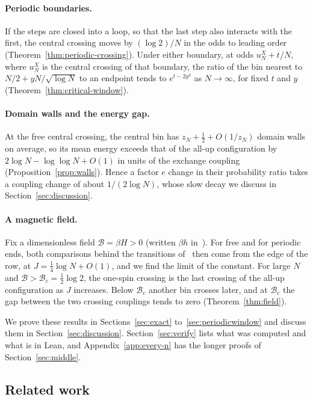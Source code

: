 \documentclass[11pt]{article}
\theoremstyle{definition}
\theoremstyle{remark}
\begin{document}
\paragraph{Periodic boundaries.} If the steps are closed into a loop, so that
the last step also interacts with the first, the central crossing moves by
$(\log2)/N$ in the odds to leading order (Theorem~\ref{thm:periodic-crossing}).
Under either boundary, at odds $u_N^X+t/N$, where $u_N^X$ is the central
crossing of that boundary, the ratio of the bin nearest to $N/2+yN/\sqrt{\log N}$ to an
endpoint tends to $e^{t-2y^2}$ as $N\to\infty$, for fixed $t$ and $y$
(Theorem~\ref{thm:critical-window}).

\paragraph{Domain walls and the energy gap.}
At the free central crossing, the central bin has
$z_N+\frac12+O(1/z_N)$ domain walls on average, so its mean energy
exceeds that of the all-up configuration by
$2\log N-\log\log N+O(1)$ in units of the exchange coupling
(Proposition~\ref{prop:walls}).
Hence a factor $e$ change in their probability ratio takes a coupling
change of about $1/(2\log N)$, whose slow decay we discuss in
Section~\ref{sec:discussion}.

\paragraph{A magnetic field.} Fix a dimensionless field
$\mathcal B=\beta H>0$ (written $\beta h$ in~\cite{stepanyan2024}). For free and for periodic ends,
both comparisons behind the transitions of~\cite{stepanyan2024} then come from the edge of
the row, at $J=\frac14\log N+O(1)$, and we find the limit of the constant. For large $N$ and $\mathcal B>\mathcal B_c=\frac12\log2$, the
one-spin crossing is the last crossing of the all-up configuration as $J$ increases. Below
$\mathcal B_c$ another bin crosses later, and at $\mathcal B_c$ the
gap between the two crossing couplings tends to zero (Theorem~\ref{thm:field}).

We prove these results in Sections~\ref{sec:exact} to~\ref{sec:periodicwindow}
and discuss them in Section~\ref{sec:discussion}.
Section~\ref{sec:verify} lists what was computed and what is in
Lean, and Appendix~\ref{app:every-n} has the longer proofs of Section~\ref{sec:middle}.

\subsection{Related work}
\end{document}
